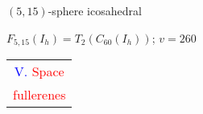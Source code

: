 \documentclass[%
pdf,
colorBG,
slideColor,
]{prosper}
\begin{document}
\begin{slide}{$(5,15)$-sphere icosahedral}
\begin{center}
\begin{minipage}{5.5cm}
\centering
{}\par
\end{minipage}
\hspace{0.1cm}
\begin{minipage}{5.5cm}
\centering
{}\par
\end{minipage}
\end{center}
\begin{center}
$F_{5,15}(I_h) = T_2(C_{60}(I_h))$; $v=260$
\end{center}
\end{slide}







\begin{slide}{}
\begin{center}
{\Huge 
\begin{tabular*}{6cm}{c}
\\[-0.5cm]
\textcolor{blue}{V. }\textcolor{red}{Space}\\
\textcolor{red}{fullerenes}
\end{tabular*}
}
\end{center}
\end{slide}
\end{document}
